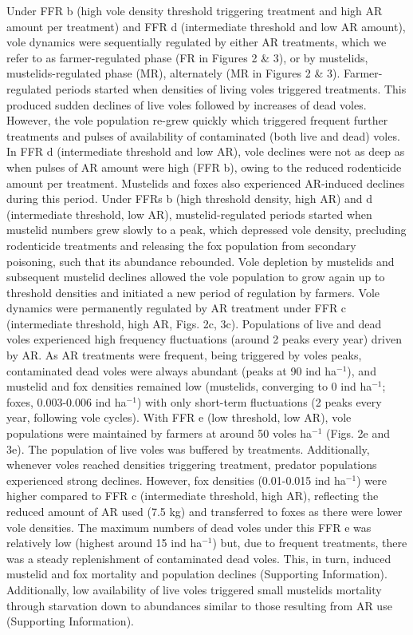 \documentclass[11pt]{article}
\begin{document}
Under FFR b (high vole density threshold triggering treatment and high AR amount per treatment) and FFR d (intermediate threshold and low AR amount), vole dynamics were sequentially regulated by either AR treatments, which we refer to as farmer-regulated phase (FR in Figures 2 \& 3), or by mustelids, mustelids-regulated phase (MR), alternately (MR in Figures 2 \& 3). Farmer-regulated periods started when densities of living voles triggered treatments. This produced sudden declines of live voles followed by increases of dead voles. However, the vole population re-grew quickly which triggered frequent further treatments and pulses of availability of contaminated (both live and dead) voles. In FFR d (intermediate threshold and low AR), vole declines were not as deep as when pulses of AR amount were high (FFR b), owing to the reduced rodenticide amount per treatment. Mustelids and foxes also experienced AR-induced declines during this period. Under FFRs b (high threshold density, high AR) and d (intermediate threshold, low AR), mustelid-regulated periods started when mustelid numbers grew slowly to a peak, which depressed vole density, precluding rodenticide treatments and releasing the fox population from secondary poisoning, such that its abundance rebounded. Vole depletion by mustelids and subsequent mustelid declines allowed the vole population to grow again up to threshold densities and initiated a new period of regulation by farmers.
Vole dynamics were permanently regulated by AR treatment under FFR c (intermediate threshold, high AR, Figs. 2c, 3c). Populations of live and dead voles experienced high frequency fluctuations (around 2 peaks every year) driven by AR. As AR treatments were frequent, being triggered by voles peaks, contaminated dead voles were always abundant (peaks at 90 ind ha$^{-1}$), and mustelid and fox densities remained low (mustelids, converging to 0 ind ha$^{-1}$; foxes, 0.003-0.006 ind ha$^{-1}$) with only short-term fluctuations (2 peaks every year, following vole cycles).
With FFR e (low threshold, low AR), vole populations were maintained by farmers at around 50 voles ha$^{-1}$ (Figs. 2e and 3e). The population of live voles was buffered by treatments. Additionally, whenever voles reached densities triggering treatment, predator populations experienced strong declines. However, fox densities (0.01-0.015 ind ha$^{-1}$) were higher compared to FFR c (intermediate threshold, high AR), reflecting the reduced amount of AR used (7.5 kg) and transferred to foxes as there were lower vole densities. The maximum numbers of dead voles under this FFR e was relatively low (highest around 15 ind ha$^{-1}$) but, due to frequent treatments, there was a steady replenishment of contaminated dead voles. This, in turn, induced mustelid and fox mortality and population declines (Supporting Information). Additionally, low availability of live voles triggered small mustelids mortality through starvation down to abundances similar to those resulting from AR use (Supporting Information). 
\end{document}
